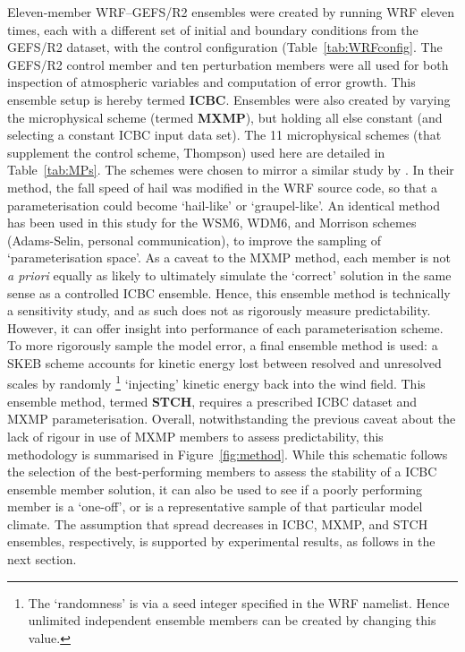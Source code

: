 \documentclass{ametsoc}
\def\gefs{\mbox{GEFS/R2}} %
\begin{document}
Eleven-member WRF--\gefs{} ensembles were created by running WRF eleven times, each with a different set of initial and boundary conditions from the \gefs{} dataset, with the control configuration (Table~\ref{tab:WRFconfig}. The \gefs{} control member and ten perturbation members were all used for both inspection of atmospheric variables and computation of error growth. This ensemble setup is hereby termed \textbf{ICBC}. Ensembles were also created by varying the microphysical scheme (termed \textbf{MXMP}), but holding all else constant (and selecting a constant ICBC input data set). The 11 microphysical schemes (that supplement the control scheme, Thompson) used here are detailed in Table~\ref{tab:MPs}. The schemes were chosen to mirror a similar study by \citet{Adams-Selin2013-om}. In their method, the fall speed of hail was modified in the WRF source code, so that a parameterisation could become `hail-like' or `graupel-like'. An identical method has been used in this study for the WSM6, WDM6, and Morrison schemes (Adams-Selin, personal communication), to improve the sampling of `parameterisation space'. As a caveat to the MXMP method, each member is not {\it a priori} equally as likely to ultimately simulate the `correct' solution in the same sense as a controlled ICBC ensemble. Hence, this ensemble method is technically a sensitivity study, and as such does not as rigorously measure predictability. However, it can offer insight into performance of each parameterisation scheme. To more rigorously sample the model error, a final ensemble method is used: a SKEB scheme \citep{Berner2011-pd} accounts for kinetic energy lost between resolved and unresolved scales by randomly \footnote{The `randomness' is via a seed integer specified in the WRF namelist. Hence unlimited independent ensemble members can be created by changing this value.} `injecting' kinetic energy back into the wind field. This ensemble method, termed \textbf{STCH}, requires a prescribed ICBC dataset and MXMP parameterisation. Overall, notwithstanding the previous caveat about the lack of rigour in use of MXMP members to assess predictability, this methodology is summarised in Figure~\ref{fig:method}. While this schematic follows the selection of the best-performing members to assess the stability of a ICBC ensemble member solution, it can also be used to see if a poorly performing member is a `one-off', or is a representative sample of that particular model climate. The assumption that spread decreases in ICBC, MXMP, and STCH ensembles, respectively, is supported by experimental results, as follows in the next section.
\end{document}
